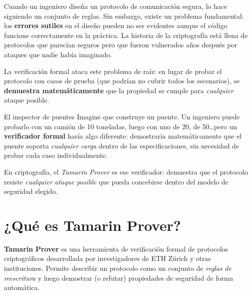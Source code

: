 \documentclass[12pt, a4paper]{article}
\begin{document}
\medskip

Cuando un ingeniero diseña un protocolo de comunicación segura, lo hace
siguiendo un conjunto de reglas. Sin embargo, existe un problema fundamental:
los \textbf{errores sutiles} en el diseño pueden no ser evidentes aunque el
código funcione correctamente en la práctica. La historia de la criptografía
está llena de protocolos que parecían seguros pero que fueron vulnerados años
después por ataques que nadie había imaginado.

\medskip

La verificación formal ataca este problema de raíz: en lugar de probar el
protocolo con casos de prueba (que podrían no cubrir todos los escenarios),
se \textbf{demuestra matemáticamente} que la propiedad se cumple para
\textit{cualquier} ataque posible.

\begin{cajaAnalogía}{El inspector de puentes}
Imagine que construye un puente. Un ingeniero puede probarlo con un camión de
10 toneladas, luego con uno de 20, de 50\ldots pero un \textbf{verificador
formal} haría algo diferente: demostraría matemáticamente que el puente soporta
\textit{cualquier carga} dentro de las especificaciones, sin necesidad de
probar cada caso individualmente.

En criptografía, el \emph{Tamarin Prover} es ese verificador: demuestra que
el protocolo resiste \textit{cualquier ataque posible} que pueda concebirse
dentro del modelo de seguridad elegido.
\end{cajaAnalogía}

\section{¿Qué es Tamarin Prover?}

\textbf{Tamarin Prover} es una herramienta de verificación formal de protocolos
criptográficos desarrollada por investigadores de ETH Zürich y otras
instituciones. Permite describir un protocolo como un conjunto de
\textit{reglas de reescritura} y luego demostrar (o refutar) propiedades de
seguridad de forma automática.

\medskip
\end{document}
